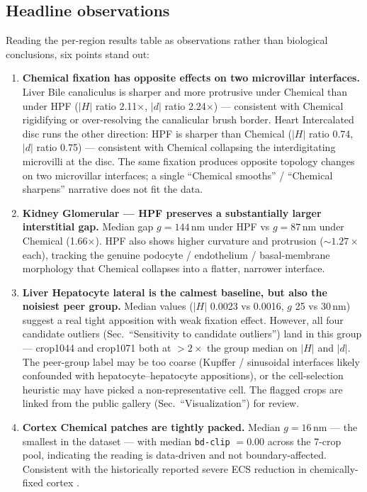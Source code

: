 \subsection*{Headline observations}
\label{sec:membrane-headline}

Reading the per-region results table as observations rather than
biological conclusions, six points stand out:

\begin{enumerate}[nosep, leftmargin=*]
\item \textbf{Chemical fixation has opposite effects on two
microvillar interfaces.} Liver Bile canaliculus is sharper and more
protrusive under Chemical than under HPF ($|H|$ ratio 2.11$\times$,
$|d|$ ratio 2.24$\times$) --- consistent with Chemical rigidifying or
over-resolving the canalicular brush border. Heart Intercalated disc
runs the other direction: HPF is sharper than Chemical ($|H|$ ratio
0.74, $|d|$ ratio 0.75) --- consistent with Chemical collapsing the
interdigitating microvilli at the disc. The same fixation produces
opposite topology changes on two microvillar interfaces; a single
``Chemical smooths'' / ``Chemical sharpens'' narrative does not fit
the data.

\item \textbf{Kidney Glomerular --- HPF preserves a substantially
larger interstitial gap.} Median gap $g = 144$\,nm under HPF vs
$g = 87$\,nm under Chemical (1.66$\times$). HPF also shows higher
curvature and protrusion ($\sim 1.27\times$ each), tracking the
genuine podocyte / endothelium / basal-membrane morphology that
Chemical collapses into a flatter, narrower interface.

\item \textbf{Liver Hepatocyte lateral is the calmest baseline, but
also the noisiest peer group.} Median values ($|H|$ 0.0023 vs 0.0016,
$g$ 25 vs 30\,nm) suggest a real tight apposition with weak
fixation effect. However, all four candidate outliers
(Sec.~``Sensitivity to candidate outliers'') land in this group ---
crop1044 and crop1071 both at $> 2\times$ the group median on $|H|$
and $|d|$. The peer-group label may be too coarse (Kupffer /
sinusoidal interfaces likely confounded with hepatocyte--hepatocyte
appositions), or the cell-selection heuristic may have picked a
non-representative cell. The flagged crops are linked from the public
gallery (Sec.~``Visualization'') for review.

\item \textbf{Cortex Chemical patches are tightly packed.} Median
$g = 16$\,nm --- the smallest in the dataset --- with median
\texttt{bd-clip} $= 0.00$ across the 7-crop pool, indicating the
reading is data-driven and not boundary-affected. Consistent with
the historically reported severe ECS reduction in chemically-fixed
cortex \cite{Korogod2015}.


\end{enumerate}
